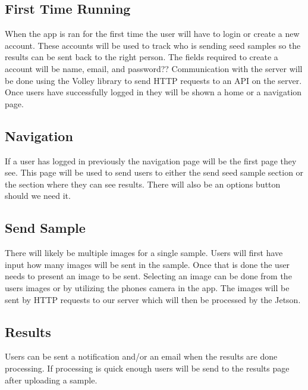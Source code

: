 \documentclass[onecolumn, draftclsnofoot,10pt, compsoc]{IEEEtran}
\begin{document}
	\subsection{First Time Running}
		When the app is ran for the first time the user will have to login or create a new account.
		These accounts will be used to track who is sending seed samples so the results can be sent back to the right person.
		The fields required to create a account will be name, email, and password??
		Communication with the server will be done using the Volley library to send HTTP requests to an API on the server.
		Once users have successfully logged in they will be shown a home or a navigation page.

	\subsection{Navigation}
		If a user has logged in previously the navigation page will be the first page they see.
		This page will be used to send users to either the send seed sample section or the section where they can see results.
		There will also be an options button should we need it.

	\subsection{Send Sample}
		There will likely be multiple images for a single sample.
		Users will first have input how many images will be sent in the sample.
		Once that is done the user needs to present an image to be sent.
		Selecting an image can be done from the users images or by utilizing the phones camera in the app.
		The images will be sent by HTTP requests to our server which will then be processed by the Jetson.

	\subsection{Results}
		Users can be sent a notification and/or an email when the results are done processing.
		If processing is quick enough users will be send to the results page after uploading a sample.
		
		



\end{document}
